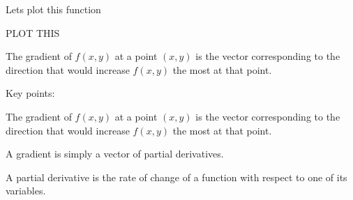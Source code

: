 \documentclass{article}
\begin{document}
Lets plot this function

PLOT THIS

The gradient of $f(x, y)$ at a point $(x, y)$ is the vector corresponding to the direction that would increase $f(x, y)$ the most at that point.

Key points:

The gradient of $f(x, y)$ at a point $(x, y)$ is the vector corresponding to the direction that would increase $f(x, y)$ the most at that point.

A gradient is simply a vector of partial derivatives.

A partial derivative is the rate of change of a function with respect to one of its variables.
\end{document}
